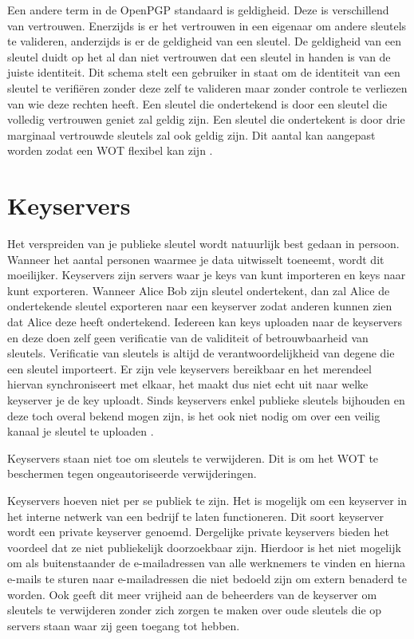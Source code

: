 Een andere term in de \gls{OpenPGP} standaard is geldigheid. Deze is verschillend van
vertrouwen. Enerzijds is er het vertrouwen in een eigenaar om andere sleutels te
valideren, anderzijds is er de geldigheid van een sleutel. De geldigheid van een
sleutel duidt op het al dan niet vertrouwen dat een sleutel in handen is van de
juiste identiteit.
Dit schema stelt een gebruiker in staat om de identiteit van een sleutel te
verifiëren zonder deze zelf te valideren maar zonder controle te verliezen van
wie deze rechten heeft. Een sleutel die ondertekend is door een sleutel die
volledig vertrouwen geniet zal geldig zijn. Een sleutel die ondertekent is door
drie marginaal vertrouwde sleutels zal ook geldig zijn. Dit aantal kan aangepast
worden zodat een WOT flexibel kan zijn \autocite{GNUManualValidatingKeys}.

\section{Keyservers}
\label{sec:keyservers}

Het verspreiden van je publieke sleutel wordt natuurlijk best gedaan in persoon.
Wanneer het aantal personen waarmee je data uitwisselt toeneemt, wordt dit
moeilijker. Keyservers zijn servers waar je keys van kunt importeren en keys
naar kunt exporteren. Wanneer Alice Bob zijn sleutel ondertekent, dan zal Alice
de ondertekende sleutel exporteren naar een keyserver zodat anderen kunnen zien
dat Alice deze heeft ondertekend. Iedereen kan keys uploaden naar de keyservers
en deze doen zelf geen verificatie van de validiteit of betrouwbaarheid van
sleutels. Verificatie van sleutels is altijd de verantwoordelijkheid van degene
die een sleutel importeert. Er zijn vele keyservers bereikbaar en het merendeel
hiervan synchroniseert met elkaar, het maakt dus niet echt uit naar welke
keyserver je de key uploadt. Sinds keyservers enkel publieke sleutels bijhouden
en deze toch overal bekend mogen zijn, is het ook niet nodig om over een veilig
kanaal je sleutel te uploaden \autocite{GNUManualDistributingKeys}.

Keyservers staan niet toe om sleutels te verwijderen. Dit is om het WOT te
beschermen tegen ongeautoriseerde verwijderingen.

Keyservers hoeven niet per se publiek te zijn. Het is mogelijk om een keyserver
in het interne netwerk van een bedrijf te laten functioneren. Dit soort
keyserver wordt een private keyserver genoemd. Dergelijke private keyservers
bieden het voordeel dat ze niet publiekelijk doorzoekbaar zijn. Hierdoor is het
niet mogelijk om als buitenstaander de e-mailadressen van alle werknemers te
vinden en hierna e-mails te sturen naar e-mailadressen die niet bedoeld zijn om
extern benaderd te worden. Ook geeft dit meer vrijheid aan de beheerders van de
keyserver om sleutels te verwijderen zonder zich zorgen te maken over oude
sleutels die op servers staan waar zij geen toegang tot hebben.


